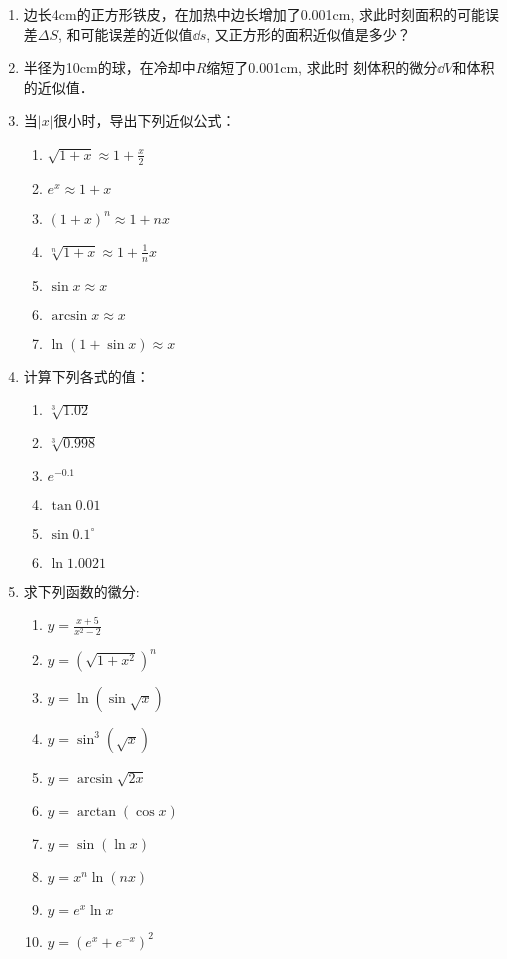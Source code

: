 \begin{ex}
\begin{enumerate}
    \item 边长4cm的正方形铁皮，在加热中边长增加了0.001cm, 
求此时刻面积的可能误差$\Delta S$, 和可能误差的近似值$\dd s$, 又正方形的面积近似值是多少？
\item 半径为10cm的球，在冷却中$R$缩短了0.001cm, 求此时
刻体积的微分$\dd V$和体积的近似值．
\item 当$|x|$很小时，导出下列近似公式：
\begin{multicols}{2}
\begin{enumerate}
    \item  $\sqrt{1+x} \approx 1+\frac{x}{2}$
\item $e^{x} \approx 1+x$
\item  $(1+x)^{n} \approx 1+n x$
\item  $\sqrt[n]{1+x} \approx 1+\frac{1}{n} x$
\item  $\sin x \approx x$
\item  $\arcsin x \approx x$
\item  $\ln (1+\sin x) \approx x$
\end{enumerate}
\end{multicols}

\item  计算下列各式的值：
\begin{multicols}{2}
\begin{enumerate}
\item  $\sqrt[3]{1.02}$
\item  $\sqrt[3]{0.998}$
\item   $e^{-0.1}$
\item   $\tan 0.01$ 
\item   $\sin 0.1^{\circ}$
\item   $\ln 1.0021$   
\end{enumerate}
\end{multicols}

\item 求下列函数的徽分:
\begin{multicols}{2}
\begin{enumerate}
    \item $y=\frac{x+5}{x^{2}-2}$
    \item  $y=\left(\sqrt{1+x^{2}}\right)^{n}$
    \item  $y=\ln (\sin \sqrt{x})$
    \item  $y=\sin ^{3}(\sqrt{x})$
    \item  $y=\arcsin \sqrt{2 x}$
    \item  $y=\arctan (\cos x)$ 
    \item $y=\sin (\ln x)$
    \item $y=x^{n} \ln (n x)$
    \item $y=e^{x} \ln x$
    \item $y=\left(e^{x}+e^{-x}\right)^{2}$
\end{enumerate}
\end{multicols}


\end{enumerate}
\end{ex}
